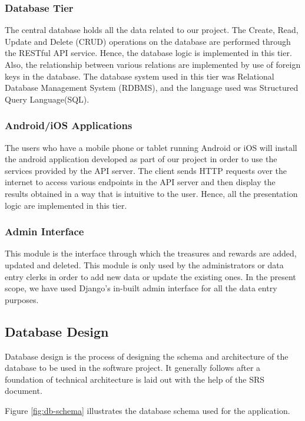 \documentclass[12pt, a4paper, oneside]{article}
\begin{document}
\subsubsection{Database Tier}
The central database holds all the data related to our project. The Create, Read, Update and Delete (CRUD) operations on the database are performed through the RESTful API service. Hence, the database logic is implemented in this tier. Also, the relationship between various relations are implemented by use of foreign keys in the database. The database system used in this tier was Relational Database Management System (RDBMS), and the language used was Structured Query Language(SQL).

\subsubsection{Android/iOS Applications}
The users who have a mobile phone or tablet running Android or iOS will install the android application developed as part of our project in order to use the services provided by the API server. The client sends HTTP requests over the internet to access various endpoints in the API server and then display the results obtained in a way that is intuitive to the user. Hence, all the presentation logic are implemented in this tier.

\subsubsection{Admin Interface}
This module is the interface through which the treasures and rewards are added, updated and deleted. This module is only used by the administrators or data entry clerks in order to add new data or update the existing ones. In the present scope, we have used Django's in-built admin interface for all the data entry purposes.

\subsection{Database Design}
Database design is the process of designing the schema and architecture of the database to be used in the software project. It generally follows after a foundation of technical architecture is laid out with the help of the SRS document.

Figure \ref{fig:db-schema} illustrates the database schema used for the application. 
\end{document}
